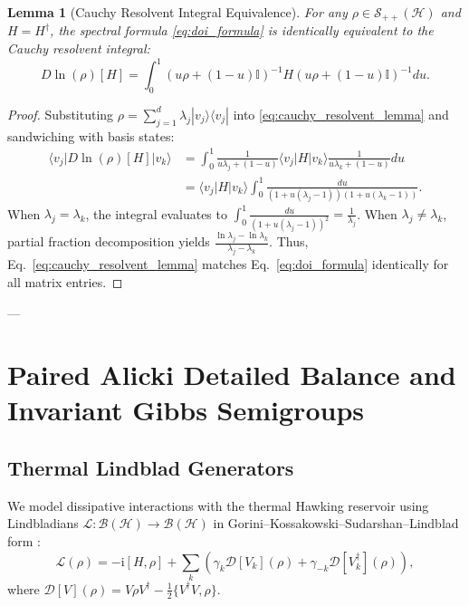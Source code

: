 \documentclass[11pt,a4paper]{article}
\theoremstyle{plain}
\newtheorem{lemma}[theorem]{Lemma}
\theoremstyle{definition}
\begin{document}
\begin{lemma}[Cauchy Resolvent Integral Equivalence]
For any $\rho \in \mathcal{S}_{++}(\mathcal{H})$ and $H = H^\dagger$, the spectral formula \eqref{eq:doi_formula} is identically equivalent to the Cauchy resolvent integral:
\begin{equation}
D\ln(\rho)[H] = \int_0^1 \left(u\rho + (1-u)\mathbb{I}\right)^{-1} H \left(u\rho + (1-u)\mathbb{I}\right)^{-1} du.
\label{eq:cauchy_resolvent_lemma}
\end{equation}
\end{lemma}
\begin{proof}
Substituting $\rho = \sum_{j=1}^d \lambda_j |v_j\rangle\langle v_j|$ into \eqref{eq:cauchy_resolvent_lemma} and sandwiching with basis states:
\begin{align}
\langle v_j | D\ln(\rho)[H] | v_k \rangle &= \int_0^1 \frac{1}{u\lambda_j + (1-u)} \langle v_j | H | v_k \rangle \frac{1}{u\lambda_k + (1-u)} du \\
&= \langle v_j | H | v_k \rangle \int_0^1 \frac{du}{(1 + u(\lambda_j - 1))(1 + u(\lambda_k - 1))}.
\end{align}
When $\lambda_j = \lambda_k$, the integral evaluates to $\int_0^1 \frac{du}{(1 + u(\lambda_j - 1))^2} = \frac{1}{\lambda_j}$. When $\lambda_j \neq \lambda_k$, partial fraction decomposition yields $\frac{\ln\lambda_j - \ln\lambda_k}{\lambda_j - \lambda_k}$. Thus, Eq.~\eqref{eq:cauchy_resolvent_lemma} matches Eq.~\eqref{eq:doi_formula} identically for all matrix entries.
\end{proof}

---

\section{Paired Alicki Detailed Balance and Invariant Gibbs Semigroups}

\subsection{Thermal Lindblad Generators}
We model dissipative interactions with the thermal Hawking reservoir using Lindbladians $\mathcal{L}: \mathcal{B}(\mathcal{H}) \to \mathcal{B}(\mathcal{H})$ in Gorini--Kossakowski--Sudarshan--Lindblad form \cite{Gorini1976,Lindblad1976}:
\begin{equation}
\mathcal{L}(\rho) = -\mathrm{i}[H, \rho] + \sum_{k} \left( \gamma_k \mathcal{D}[V_k](\rho) + \gamma_{-k} \mathcal{D}[V_k^\dagger](\rho) \right),
\end{equation}
where $\mathcal{D}[V](\rho) = V \rho V^\dagger - \frac{1}{2}\{V^\dagger V, \rho\}$.
\end{document}
